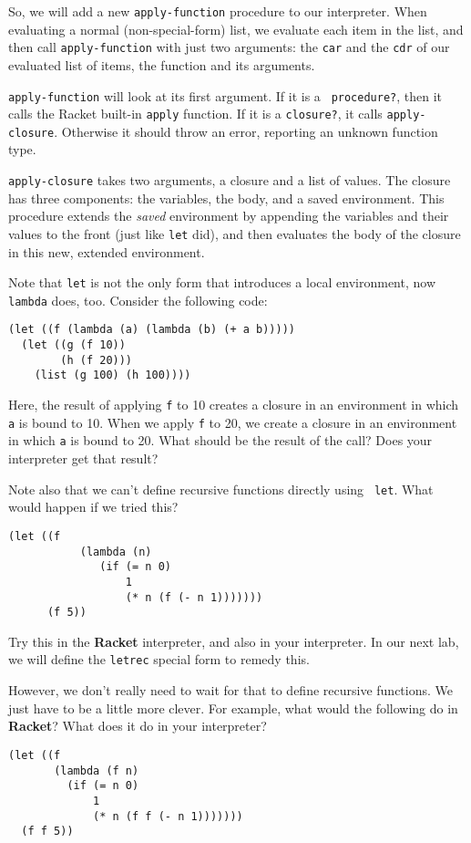 \documentclass{article}
\begin{document}
So, we will add a new {\tt apply-function} procedure to our
interpreter.  When evaluating a normal (non-special-form) list, we
evaluate each item in the list, and then call {\tt apply-function}
with just two arguments: the {\tt car} and the {\tt cdr} of our
evaluated list of items, the function and its arguments.

{\tt apply-function} will look at its first argument.  If it is a {\tt
  procedure?}, then it calls the Racket built-in {\tt apply}
function.  If it is a {\tt closure?}, it calls {\tt apply-closure}.
Otherwise it should throw an error, reporting an unknown function
type.

{\tt apply-closure} takes two arguments, a closure and a list of
values.  The closure has three components: the variables, the
body, and a saved environment.  This procedure extends the {\em
  saved} environment by appending the variables and their values to
the front (just like {\tt let} did), and then evaluates the body
of the closure in this new, extended environment.

Note that {\tt let} is not the only form that introduces a local
environment, now {\tt lambda} does, too.  Consider the following
code:
\begin{Verbatim}[frame=single]
(let ((f (lambda (a) (lambda (b) (+ a b)))))
  (let ((g (f 10))
        (h (f 20)))
    (list (g 100) (h 100))))  
\end{Verbatim}
Here, the result of applying {\tt f} to 10 creates a closure in an
environment in which {\tt a} is bound to 10.  When we apply {\tt f} to
20, we create a closure in an environment in which {\tt a} is bound to
20.  What should be the result of the call?  Does your interpreter get
that result?

Note also that we can't define recursive functions directly using {\tt
  let}.  What would happen if we tried this?
\begin{Verbatim}[frame=single]
  (let ((f
           (lambda (n)
              (if (= n 0)
                  1
                  (* n (f (- n 1)))))))
      (f 5))
\end{Verbatim}
Try this in the {\bf Racket} interpreter, and also in your
interpreter.
In our next lab, we will define the {\tt letrec} special
form to remedy this.

However, we don't really need to wait for that to define
recursive functions.  We just have to be a little more clever.
For example, what would the following do in {\bf Racket}?  What does
it do in your interpreter?
\begin{Verbatim}[frame=single]
(let ((f
       (lambda (f n)
         (if (= n 0)
             1
             (* n (f f (- n 1)))))))
  (f f 5))
\end{Verbatim}
\end{document}
